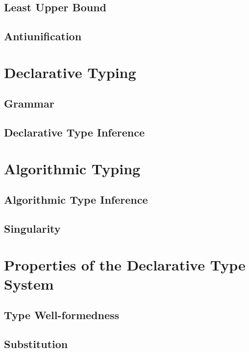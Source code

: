 \documentclass[a4,natbib=false]{article}
\begin{document}
\subsection{Least Upper Bound}
\ottdefnsLUB

\subsection{Antiunification}
\ottdefnsAU


\section{Declarative Typing}
 
\subsection{Grammar}

\bigskip
\ottgrammartabular{
  \ottv\ottinterrule
  \ottc\ottinterrule
}

\subsection{Declarative Type Inference}
\ottdefnsDT


\section{Algorithmic Typing}

\subsection{Algorithmic Type Inference}
\ottdefnsAT

\subsection{Singularity}
\ottdefnsSING


\section{Properties of the Declarative Type System}

\subsection{Type Well-formedness}


\subsection{Substitution}
\end{document}
